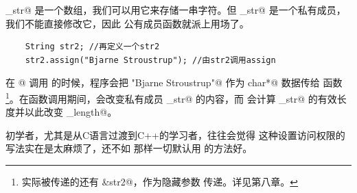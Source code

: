 \lstinline@_str@ 是一个数组，我们可以用它来存储一串字符。但 \lstinline@_str@ 是一个私有成员，我们不能直接修改它，因此 \lstinline@assign@ 公有成员函数就派上用场了。
\begin{lstlisting}
    String str2; //再定义一个str2
    str2.assign("Bjarne Stroustrup"); //由str2调用assign
\end{lstlisting}
在 @ 调用 \lstinline@assign@ 的时候，程序会把 \lstinline@"Bjarne Stroustrup"@ 作为 \lstinline@const char*@ 数据传给 \lstinline@assign@ 函数\footnote{实际被传递的还有 \lstinline@&str2@，作为隐藏参数 \lstinline@this@ 传递。详见第八章。}。在函数调用期间，\lstinline@strncpy@ 会改变私有成员 \lstinline@_str@ 的内容，而 \lstinline@strlen@ 会计算 \lstinline@_str@ 的有效长度并以此改变 \lstinline@_length@。\par
初学者，尤其是从C语言过渡到C++的学习者，往往会觉得 \lstinline@class@ 这种设置访问权限的写法实在是太麻烦了，还不如 \lstinline@struct@ 那样一切默认用 \lstinline@public@ 的方法好。
